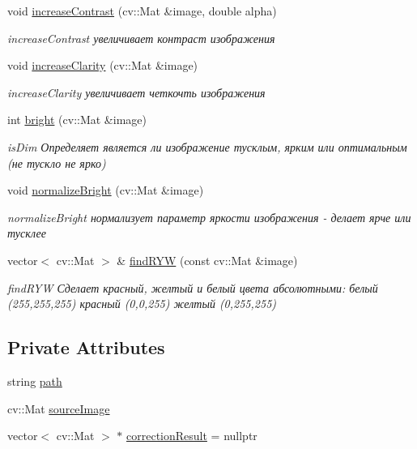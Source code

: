 \begin{DoxyCompactItemize}
void \hyperlink{class_correction_adfc060f705da270932f1a8adec8ce567}{increase\+Contrast} (cv\+::\+Mat \&image, double alpha)
\begin{DoxyCompactList}\small\item\em increase\+Contrast увеличивает контраст изображения \end{DoxyCompactList}\item 
void \hyperlink{class_correction_ae9b87cadf876be9832d886fb44d913f2}{increase\+Clarity} (cv\+::\+Mat \&image)
\begin{DoxyCompactList}\small\item\em increase\+Clarity увеличивает четкочть изображения \end{DoxyCompactList}\item 
int \hyperlink{class_correction_ab414b82542d44827c55fd3e04e6696f7}{bright} (cv\+::\+Mat \&image)
\begin{DoxyCompactList}\small\item\em is\+Dim Определяет является ли изображение тусклым, ярким или оптимальным (не тускло не ярко) \end{DoxyCompactList}\item 
void \hyperlink{class_correction_a80784bcdd2ac906f3c06713540cc5a0c}{normalize\+Bright} (cv\+::\+Mat \&image)
\begin{DoxyCompactList}\small\item\em normalize\+Bright нормализует параметр яркости изображения -\/ делает ярче или тусклее \end{DoxyCompactList}\item 
vector$<$ cv\+::\+Mat $>$ \& \hyperlink{class_correction_a24fe63583741bbe777222015483d888a}{find\+R\+Y\+W} (const cv\+::\+Mat \&image)
\begin{DoxyCompactList}\small\item\em find\+R\+Y\+W Сделает красный, желтый и белый цвета абсолютными\+: белый (255,255,255) красный (0,0,255) желтый (0,255,255) \end{DoxyCompactList}\end{DoxyCompactItemize}
\subsection*{Private Attributes}
\begin{DoxyCompactItemize}
\item 
string \hyperlink{class_correction_a6e1ccea5c33ea89d717d9227d17f625c}{path}
\item 
cv\+::\+Mat \hyperlink{class_correction_a1344ad4fb7d6a6346c2524e06feddd4b}{source\+Image}
\item 
vector$<$ cv\+::\+Mat $>$ $\ast$ \hyperlink{class_correction_a02fff781df4df45a3bb6f0a2484cafcc}{correction\+Result} = nullptr
\end{DoxyCompactItemize}


